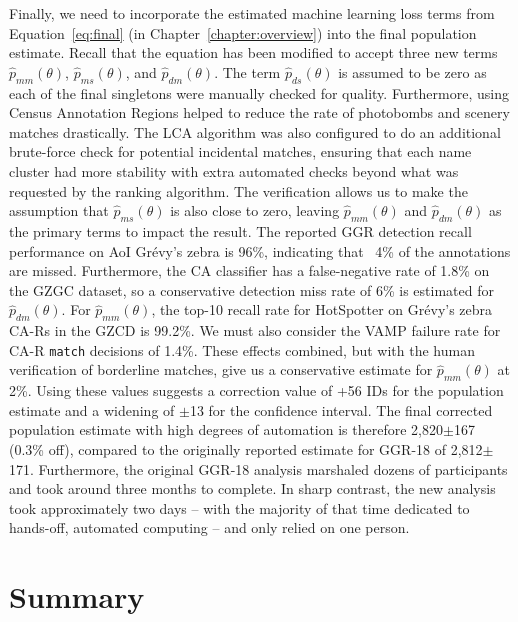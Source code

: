 Finally, we need to incorporate the estimated machine learning loss terms from Equation~\eqref{eq:final} (in Chapter~\ref{chapter:overview}) into the final population estimate.  Recall that the equation has been modified to accept three new terms $\hat{p}_{mm}(\theta)$, $\hat{p}_{ms}(\theta)$, and $\hat{p}_{dm}(\theta)$.  The term $\hat{p}_{ds}(\theta)$ is assumed to be zero as each of the final singletons were manually checked for quality.  Furthermore, using Census Annotation Regions helped to reduce the rate of photobombs and scenery matches drastically.  The LCA algorithm was also configured to do an additional brute-force check for potential incidental matches, ensuring that each name cluster had more stability with extra automated checks beyond what was requested by the ranking algorithm.  The verification allows us to make the assumption that $\hat{p}_{ms}(\theta)$ is also close to zero, leaving $\hat{p}_{mm}(\theta)$ and $\hat{p}_{dm}(\theta)$ as the primary terms to impact the result.  The reported GGR detection recall performance on AoI Gr\'evy's zebra is 96\%, indicating that ~4\% of the annotations are missed.  Furthermore, the CA classifier has a false-negative rate of 1.8\% on the GZGC dataset, so a conservative detection miss rate of 6\% is estimated for $\hat{p}_{dm}(\theta)$.  For $\hat{p}_{mm}(\theta)$, the top-10 recall rate for HotSpotter on Gr\'evy's zebra CA-Rs in the GZCD is 99.2\%.  We must also consider the VAMP failure rate for CA-R \texttt{match} decisions of 1.4\%.  These effects combined, but with the human verification of borderline matches, give us a conservative estimate for $\hat{p}_{mm}(\theta)$ at 2\%.  Using these values suggests a correction value of +56 IDs for the population estimate and a widening of $\pm$13 for the confidence interval.  The final corrected population estimate with high degrees of automation is therefore 2,820$\pm$167 (0.3\% off), compared to the originally reported estimate for GGR-18 of 2,812$\pm$171.  Furthermore, the original GGR-18 analysis marshaled dozens of participants and took around three months to complete.  In sharp contrast, the new analysis took approximately two days -- with the majority of that time dedicated to hands-off, automated computing -- and only relied on one person.

\section{Summary}

